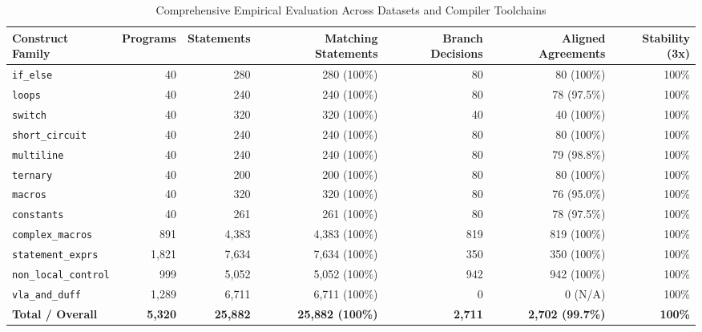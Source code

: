 \begin{table}[t]
\centering
\caption{Comprehensive Empirical Evaluation Across Datasets and Compiler Toolchains}
\label{tab:main_results}
\begin{tabular}{lrrrrrr}
\toprule
\textbf{Construct Family} & \textbf{Programs} & \textbf{Statements} & \textbf{Matching Statements} & \textbf{Branch Decisions} & \textbf{Aligned Agreements} & \textbf{Stability (3x)} \\
\midrule
\texttt{if\_else}               & 40 & 280 & 280 (100\%) & 80 & 80 (100\%) & 100\% \\
\texttt{loops}                 & 40 & 240 & 240 (100\%) & 80 & 78 (97.5\%) & 100\% \\
\texttt{switch}                & 40 & 320 & 320 (100\%) & 40 & 40 (100\%) & 100\% \\
\texttt{short\_circuit}        & 40 & 240 & 240 (100\%) & 80 & 80 (100\%) & 100\% \\
\texttt{multiline}             & 40 & 240 & 240 (100\%) & 80 & 79 (98.8\%) & 100\% \\
\texttt{ternary}               & 40 & 200 & 200 (100\%) & 80 & 80 (100\%) & 100\% \\
\texttt{macros}                & 40 & 320 & 320 (100\%) & 80 & 76 (95.0\%) & 100\% \\
\texttt{constants}             & 40 & 261 & 261 (100\%) & 80 & 78 (97.5\%) & 100\% \\
\midrule
\texttt{complex\_macros}       & 891 & 4,383 & 4,383 (100\%) & 819 & 819 (100\%) & 100\% \\
\texttt{statement\_exprs}      & 1,821 & 7,634 & 7,634 (100\%) & 350 & 350 (100\%) & 100\% \\
\texttt{non\_local\_control}   & 999 & 5,052 & 5,052 (100\%) & 942 & 942 (100\%) & 100\% \\
\texttt{vla\_and\_duff}        & 1,289 & 6,711 & 6,711 (100\%) & 0 & 0 (N/A) & 100\% \\
\midrule
\textbf{Total / Overall}       & \textbf{5,320} & \textbf{25,882} & \textbf{25,882 (100\%)} & \textbf{2,711} & \textbf{2,702 (99.7\%)} & \textbf{100\%} \\
\bottomrule
\end{tabular}
\end{table}
